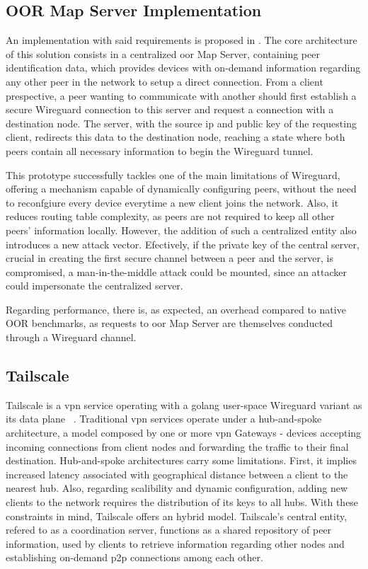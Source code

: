 \documentclass[11pt,twoside,a4paper]{report}
\begin{document}
\subsection{OOR Map Server Implementation}

An implementation with said requirements is proposed in \cite{paillisse2021control}. The core architecture of this solution consists in a centralized \ac{oor} Map Server, containing peer identification data, which provides devices with on-demand information regarding any other peer in the network to setup a direct connection.  From a client prespective, a peer wanting to communicate with another should first establish a secure Wireguard connection to this server and request a connection with a destination node. The server, with the source \ac{ip} and public key of the requesting client, redirects this data to the destination node, reaching a state where both peers contain all necessary information to begin the Wireguard tunnel.

This prototype successfully tackles one of the main limitations of Wireguard, offering a mechanism capable of dynamically configuring peers, without the need to reconfgiure every device everytime a new client joins the network. Also, it reduces routing table complexity, as peers are not required to keep all other peers' information locally. However, the addition of such a centralized entity also introduces a new attack vector. Efectively, if the private key of the central server, crucial in creating the first secure channel between a peer and the server, is compromised, a man-in-the-middle attack could be mounted, since an attacker could impersonate the centralized server.

Regarding performance, there is, as expected, an overhead compared to native OOR benchmarks, as requests to \ac{oor} Map Server are themselves conducted through a Wireguard channel.

\subsection{Tailscale}

Tailscale is a \ac{vpn} service operating with a golang user-space Wireguard variant as its data plane ~\cite{tailscale2020online}. Traditional \ac{vpn} services operate under a hub-and-spoke architecture, a model composed by one or more \ac{vpn} Gateways - devices accepting incoming connections from client nodes and forwarding the traffic to their final destination. Hub-and-spoke architectures carry some limitations. First, it implies increased latency associated with geographical distance between a client to the nearest hub. Also, regarding scalibility and dynamic configuration, adding new clients to the network requires the distribution of its keys to all hubs. With these constraints in mind, Tailscale offers an hybrid model. Tailscale's central entity, refered to as a coordination server, functions as a shared repository of peer information, used by clients to retrieve information regarding other nodes and establishing on-demand \ac{p2p} connections among each other.
\end{document}

